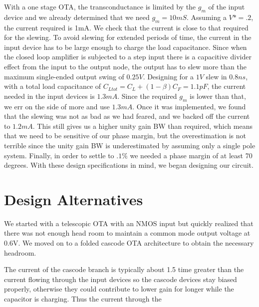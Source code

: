 \documentclass[conference]{IEEEtran}
\begin{document}
With a one stage OTA, the transconductance is limited by the $g_m$ of the input device and we already determined that we need $g_m = 10mS$. Assuming a $V* = .2$, the current required is 1mA. We check that the current is close to that required for the slewing. To avoid slewing for extended periods of time, the current in the input device has to be large enough to charge the load capacitance. Since when the closed loop amplifier is subjected to a step input there is a capacitive divider effect from the input to the output node, the output has to slew more than the maximum single-ended output swing of $0.25V$. Designing for a $1V$ slew in $0.8ns$, with a total load capacitance of $C_{Ltot} = C_L + (1-\beta)C_F = 1.1pF$, the current needed in the input devices is $1.3mA$. Since the required $g_m$ is lower than that, we err on the side of more and use  $1.3mA$. Once it was implemented, we found that the slewing was not as bad as we had feared, and we backed off the current to $1.2mA$. This still gives us a higher unity gain BW than required, which means that we need to be sensitive of our phase margin, but the overestimation is not terrible since the unity gain BW is underestimated by assuming only a single pole system. Finally, in order to settle to $.1\%$ we needed a phase margin of at least 70 degrees. With these design specifications in mind, we began designing our circuit.\\

\section{Design Alternatives}

We started with a telescopic OTA with an NMOS input but quickly realized that there was not enough head room to maintain a common mode output voltage at 0.6V. We moved on to a folded cascode OTA architecture to obtain the necessary headroom. 

The current of the cascode branch is typically about 1.5 time greater than the current flowing through the input devices so the cascode devices stay biased properly, otherwise they could contribute to lower gain for longer while the capacitor is charging. Thus the current through the 
\end{document}
